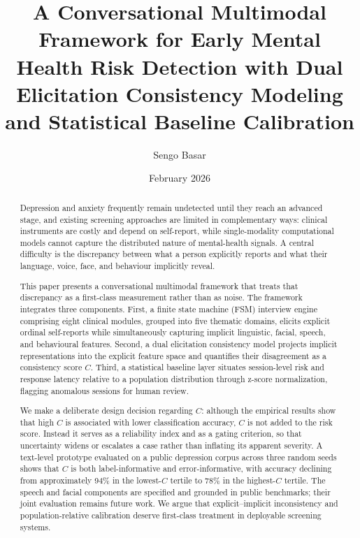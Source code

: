 \documentclass[12pt]{article}
\title{A Conversational Multimodal Framework for Early Mental Health Risk
Detection with Dual Elicitation Consistency Modeling and Statistical
Baseline Calibration}
\author{Sengo Basar}
\date{February 2026}
\begin{document}
\maketitle

\begin{abstract}
Depression and anxiety frequently remain undetected until they reach an
advanced stage, and existing screening approaches are limited in
complementary ways: clinical instruments are costly and depend on
self-report, while single-modality computational models cannot capture
the distributed nature of mental-health signals. A central difficulty is
the discrepancy between what a person explicitly reports and what their
language, voice, face, and behaviour implicitly reveal.

This paper presents a conversational multimodal framework that treats
that discrepancy as a first-class measurement rather than as noise. The
framework integrates three components. First, a finite state machine
(FSM) interview engine comprising eight clinical modules, grouped into
five thematic domains, elicits explicit ordinal self-reports while
simultaneously capturing implicit linguistic, facial, speech, and
behavioural features. Second, a dual elicitation consistency model
projects implicit representations into the explicit feature space and
quantifies their disagreement as a consistency score $C$. Third, a
statistical baseline layer situates session-level risk and response
latency relative to a population distribution through z-score
normalization, flagging anomalous sessions for human review.

We make a deliberate design decision regarding $C$: although the
empirical results show that high $C$ is associated with lower
classification accuracy, $C$ is not added to the risk score. Instead it
serves as a reliability index and as a gating criterion, so that
uncertainty widens or escalates a case rather than inflating its
apparent severity. A text-level prototype evaluated on a public
depression corpus across three random seeds shows that $C$ is both
label-informative and error-informative, with accuracy declining from
approximately 94\% in the lowest-$C$ tertile to 78\% in the
highest-$C$ tertile. The speech and facial components are specified and
grounded in public benchmarks; their joint evaluation remains future
work. We argue that explicit--implicit inconsistency and
population-relative calibration deserve first-class treatment in
deployable screening systems.
\end{abstract}
\end{document}
